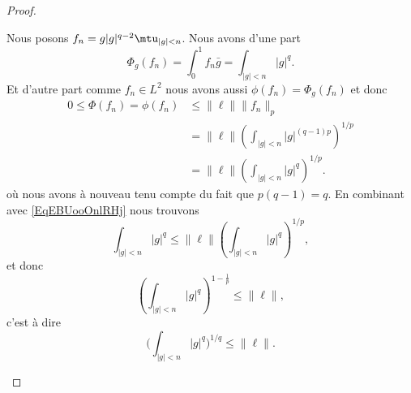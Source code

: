 \begin{proof}
\begin{subproof}
\begin{subproof}
                    Nous posons \( f_n=g| g |^{q-2}\mtu_{| g |<n}\). Nous avons d'une part
                    \begin{equation}    \label{EqEBUooOnlRHj}
                        \Phi_g(f_n)=\int_0^1f_n\bar g=\int_{| g |<n}| g |^q.
                    \end{equation}
                    Et d'autre part comme \( f_n\in L^2\) nous avons aussi \( \phi(f_n)=\Phi_g(f_n)\) et donc
                    \begin{subequations}
                        \begin{align}
                            0\leq \Phi(f_n)= \phi(f_n)&\leq \| \ell \|\| f_n \|_p\\
                            &=\| \ell \|\left( \int_{| g |<n}| g |^{(q-1)p} \right)^{1/p}\\
                            &=\| \ell \|\left( \int_{| g |<n}| g |^q \right)^{1/p}.
                        \end{align}
                    \end{subequations}
                    où nous avons à nouveau tenu compte du fait que \( p(q-1)=q\). En combinant avec \eqref{EqEBUooOnlRHj} nous trouvons
                    \begin{equation}
                        \int_{| g |<n}| g |^q\leq \| \ell \|\left( \int_{| g |<n}| g |^q \right)^{1/p},
                    \end{equation}
                    et donc
                    \begin{equation}
                        \left( \int_{| g |<n}| g |^{q} \right)^{1-\frac{1}{ p }}\leq \| \ell \|,
                    \end{equation}
                    c'est à dire
                    \begin{equation}
                        \Big( \int_{| g |<n}| g |^q \Big)^{1/q}\leq \| \ell \|.
                    \end{equation}


\end{subproof}
\end{subproof}
\end{proof}

